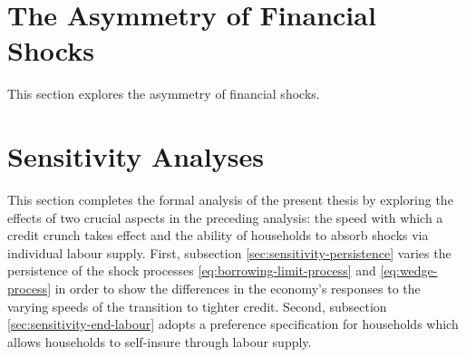 \documentclass[12pt]{article} %
\numberwithin{equation}{section} %
\numberwithin{figure}{section}
\numberwithin{table}{section}
\begin{document}





\section{The Asymmetry of Financial Shocks}
\label{sec:asymmetry}

This section explores the asymmetry of financial shocks.

\section{Sensitivity Analyses}
\label{sec:sensitivity}

This section completes the formal analysis of the present thesis by exploring the effects of two crucial aspects in the preceding analysis: the speed with which a credit crunch takes effect and the ability of households to absorb shocks via individual labour supply. First, subsection \ref{sec:sensitivity-persistence} varies the persistence of the shock processes \eqref{eq:borrowing-limit-process} and \eqref{eq:wedge-process} in order to show the differences in the economy's responses to the varying speeds of the transition to tighter credit. Second, subsection \ref{sec:sensitivity-end-labour} adopts a preference specification for households which allows households to self-insure through labour supply.
\end{document}
